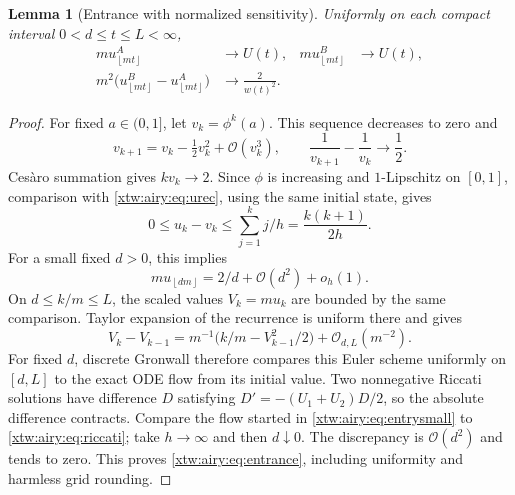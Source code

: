 \documentclass[11pt]{article}
\newtheorem{lemma}[theorem]{Lemma}
\theoremstyle{remark}\newtheorem{remark}[theorem]{Remark}
\newcommand{\OO}{\mathcal O}
\newcommand{\floor}[1]{\left\lfloor #1\right\rfloor}
\begin{document}
\begin{lemma}[Entrance with normalized sensitivity]\label{xtw:airy:lem:entrance}
Uniformly on each compact interval $0<d\le t\le L<\infty$,
\begin{align}
 mu_{\floor{mt}}^A&\longrightarrow U(t),&
 mu_{\floor{mt}}^B&\longrightarrow U(t),\label{xtw:airy:eq:entrance}\\
 m^2\bigl(u_{\floor{mt}}^B-u_{\floor{mt}}^A\bigr)
 &\longrightarrow\frac{2}{w(t)^2}.&&\label{xtw:airy:eq:sensitivity}
\end{align}
\end{lemma}
\begin{proof}
For fixed $a\in(0,1]$, let $v_k=\phi^k(a)$. This sequence decreases to zero and
\[
 v_{k+1}=v_k-\tfrac12v_k^2+\OO(v_k^3),\qquad
 \frac1{v_{k+1}}-\frac1{v_k}\longrightarrow\frac12.
\]
Ces\`aro summation gives $kv_k\to2$. Since $\phi$ is increasing and
$1$-Lipschitz on $[0,1]$, comparison with \eqref{xtw:airy:eq:urec}, using the same initial
state, gives
\begin{equation}\label{xtw:airy:eq:autocompare}
 0\le u_k-v_k\le\sum_{j=1}^k j/h=\frac{k(k+1)}{2h}.
\end{equation}
For a small fixed $d>0$, this implies
\begin{equation}\label{xtw:airy:eq:entrysmall}
 mu_{\floor{dm}}=2/d+\OO(d^2)+o_h(1).
\end{equation}
On $d\le k/m\le L$, the scaled values $V_k=mu_k$ are bounded by the same
comparison. Taylor expansion of the recurrence is uniform there and gives
\begin{equation}\label{xtw:airy:eq:euler}
 V_k-V_{k-1}=m^{-1}\bigl(k/m-V_{k-1}^2/2\bigr)+\OO_{d,L}(m^{-2}).
\end{equation}
For fixed $d$, discrete Gronwall therefore compares this Euler scheme uniformly
on $[d,L]$ to the exact ODE flow from its initial value. Two nonnegative
Riccati solutions have difference $D$ satisfying
$D'=-(U_1+U_2)D/2$, so the absolute difference contracts. Compare the flow
started in \eqref{xtw:airy:eq:entrysmall} to \eqref{xtw:airy:eq:riccati}; take $h\to\infty$ and
then $d\downarrow0$. The discrepancy is $\OO(d^2)$ and tends to zero. This
proves \eqref{xtw:airy:eq:entrance}, including uniformity and harmless grid rounding.


\end{proof}
\end{document}
